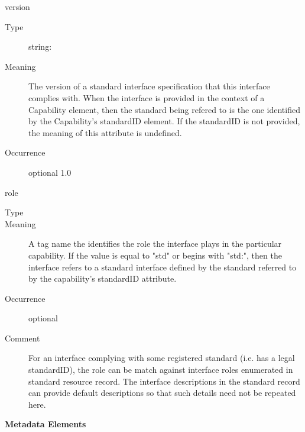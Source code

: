 \documentclass[11pt,a4paper]{ivoa}
\begin{document}
\begingroup\small\begin{bigdescription}
\item[version]
\begin{description}
\item[Type] string: 
\item[Meaning] 
               The version of a standard interface specification that this 
               interface complies with.  When the interface is
               provided in the context of a Capability element, then
               the standard being refered to is the one identified by
               the Capability's standardID element.  If the standardID
               is not provided, the meaning of this attribute is
               undefined.  
            
\item[Occurrence] optional
1.0
\end{description}
\item[role]
\begin{description}
\item[Type] 
\item[Meaning] 
               A tag name the identifies the role the interface plays
               in the particular capability.  If the value is equal to
               {"}std{"} or begins with {"}std:{"}, then the interface refers
               to a standard interface defined by the standard
               referred to by the capability's standardID attribute.  
            
\item[Occurrence] optional
\item[Comment] 
               For an interface complying with some registered
               standard (i.e. has a legal standardID), the role can be
               match against interface roles enumerated in standard 
               resource record.  The interface descriptions in
               the standard record can provide default descriptions 
               so that such details need not be repeated here.  
            
\end{description}


\end{bigdescription}\endgroup



\vspace{0.5ex}\noindent\textbf{ Metadata Elements}
\end{document}
